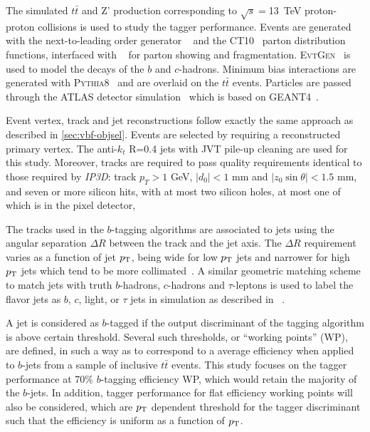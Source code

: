 The simulated $t\bar{t}$ and Z' production corresponding to $\sqrt{s}=$13~TeV proton-proton
collisions is used to study the tagger performance. Events are generated with the
next-to-leading order generator \powheg{}~\cite{bib:powheg} and the \textsc{CT10}~\cite{Lai:2010vv}
parton distribution functions, interfaced with \pythia{}~\cite{pythia2} for parton showing and
fragmentation. \textsc{EvtGen}~\cite{Lange:2001uf} is used to model the decays of
the $b$ and $c$-hadrons. Minimum bias interactions are generated with \textsc{Pythia8}~\cite{Pythia8}
and are overlaid on the $t\bar{t}$ events. Particles are passed through the ATLAS detector
simulation~\cite{atlas_simulation} which is based on \textsc{GEANT4}~\cite{geant}.

Event vertex, track and jet reconstructions follow exactly the same approach as described in \ref{sec:vbf-objsel}. Events are selected by requiring a reconstructed primary vertex. The anti-$k_t$ R=0.4 jets with JVT pile-up cleaning are used for this study. Moreover, tracks are required to pass quality requirements identical to those required by \textit{IP3D}: track $p_{T} > 1$ GeV, $| d_0 | <1$ mm and $| z_0 \sin \theta | <1.5$ mm, and seven or more silicon hits, with at most two silicon holes, at most one of which is in the pixel detector,

The tracks used in the $b$-tagging algorithms are associated to jets
using the angular separation $\Delta R$ between the track and the jet axis.
The $\Delta R$ requirement varies as a function of jet $p_{{\rm T}}$,
being wide for low $p_{{\rm T}}$ jets and narrower for high $p_{{\rm T}}$ jets which tend to be more
collimated~\cite{ref:btagPaper}.
A similar geometric matching scheme to match jets with truth $b$-hadrons, $c$-hadrons and $\tau$-leptons
is used to label the flavor jets as $b$, $c$, light, or $\tau$ jets in simulation as described in ~\cite{ATL-PHYS-PUB-2015-022}.

A jet is considered as $b$-tagged if the output
discriminant of the tagging algorithm
is above certain threshold. Several such thresholds,
or ``working points'' (WP), are defined, in such a way as to correspond to
a average efficiency when applied to $b$-jets from a sample of
inclusive $t\bar{t}$ events. This study focuses on the tagger performance at
70\% $b$-tagging efficiency WP, which would retain the majority of the $b$-jets.
In addition, tagger performance for flat efficiency working points will also be considered,
which are $p_{{\rm T}}$ dependent threshold for the tagger discriminant such that the \btagging efficiency
is uniform as a function of $p_{{\rm T}}$.
